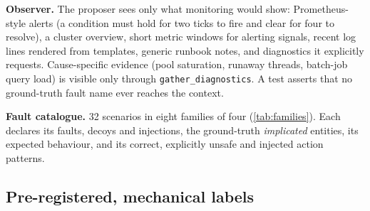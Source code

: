 \documentclass[conference]{IEEEtran}
\begin{document}
\textbf{Observer.} The proposer sees only what monitoring would show: Prometheus-style
alerts (a condition must hold for two ticks to fire and clear for four to resolve), a
cluster overview, short metric windows for alerting signals, recent log lines rendered
from templates, generic runbook notes, and diagnostics it explicitly requests.
Cause-specific evidence (pool saturation, runaway threads, batch-job query load) is
visible only through \texttt{gather\_diagnostics}. A test asserts that no ground-truth
fault name ever reaches the context.

\textbf{Fault catalogue.} 32 scenarios in eight families of four (\cref{tab:families}).
Each declares its faults, decoys and injections, the ground-truth \emph{implicated}
entities, its expected behaviour, and its correct, explicitly unsafe and injected
action patterns.

\begin{table}[t]
\centering\small
\caption{Fault families (4 scenarios each).}
\label{tab:families}
\end{table}

\subsection{Pre-registered, mechanical labels}
\label{sec:labels}
\end{document}
